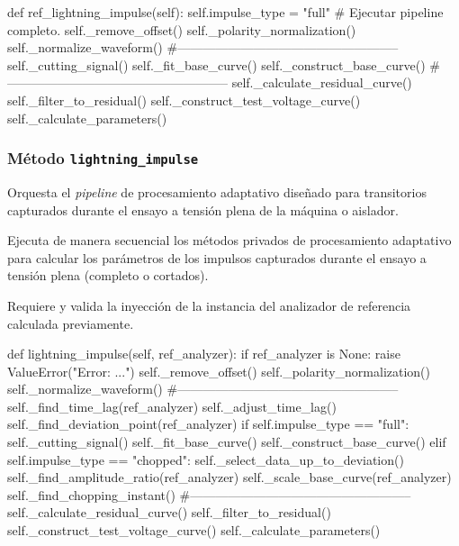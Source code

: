 \begin{python}
def ref_lightning_impulse(self):
    self.impulse_type = "full"
    # Ejecutar pipeline completo.
    self._remove_offset()
    self._polarity_normalization()
    self._normalize_waveform()
    #-----------------------------------------------------
    self._cutting_signal()
    self._fit_base_curve()
    self._construct_base_curve()
    #-----------------------------------------------------
    self._calculate_residual_curve()
    self._filter_to_residual()
    self._construct_test_voltage_curve()
    self._calculate_parameters()
\end{python}

\subsubsection{Método \texttt{lightning\_impulse}}
Orquesta el \textit{pipeline} de procesamiento adaptativo diseñado para transitorios capturados durante el ensayo a tensión plena de la máquina o aislador.

Ejecuta de manera secuencial los métodos privados de procesamiento adaptativo para calcular los parámetros de los impulsos capturados durante el ensayo a tensión plena (completo o cortados).

Requiere y valida la inyección de la instancia del analizador de referencia calculada previamente.

\begin{python}
def lightning_impulse(self, ref_analyzer):
    if ref_analyzer is None:
        raise ValueError("Error: ...")
    self._remove_offset()
    self._polarity_normalization()
    self._normalize_waveform()
    #-----------------------------------------------------
    self._find_time_lag(ref_analyzer)
    self._adjust_time_lag()
    self._find_deviation_point(ref_analyzer)
    if self.impulse_type == "full":
        self._cutting_signal()
        self._fit_base_curve()
        self._construct_base_curve()
    elif self.impulse_type == "chopped":
        self._select_data_up_to_deviation()
        self._find_amplitude_ratio(ref_analyzer)
        self._scale_base_curve(ref_analyzer)
        self._find_chopping_instant()
    #-----------------------------------------------------
    self._calculate_residual_curve()
    self._filter_to_residual()
    self._construct_test_voltage_curve()
    self._calculate_parameters()
\end{python}
